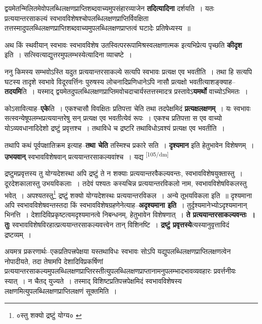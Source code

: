 \documentclass[article,12pt,a4paper]{memoir}
\begin{document}
	  \pstart द्वयमेतन्मिलितमेवोपलब्धिलक्षणप्राप्तिशब्दवाच्यमुपसंहारव्याजेन \textbf{तदित्यादिना} दर्शयति । यतः प्रत्ययान्तरसाकल्यं स्वभावविशेषश्चोपलब्धिलक्षणप्राप्तिर्विवक्षिता तत्तस्मादुपलब्धिलक्षणप्राप्तिशब्दवाच्यमुपलब्धिलक्षणप्राप्तत्वं घटादेः प्रतिषेध्यस्य ॥
	\pend
      

	  \pstart अथ किं स्थवीयान् स्वभावः स्वभावविशेष उतस्वित्पररूपामिश्रस्वलक्षणात्मक इत्यभिप्रेत्य पृच्छति \textbf{कीदृश} इति । सत्स्वित्याद्युत्तरमुपलम्भस्येत्यादिना व्याचष्टे ।
	\pend
      

	  \pstart ननु किमस्य सम्भवोऽस्ति यदुत प्रत्ययान्तरसाकल्ये सत्यपि स्वभावः प्रत्यक्ष एव भवतीति । तथा हि सत्यपि घटस्य तादृशे स्वभावे विदूरवर्त्तिनः पुरुषस्य लोचनादिप्रणिधानेऽपि नासौ प्रत्यक्षो भवतीत्याशङ्क्याह--\textbf{तदयमि}ति । यस्माद् द्वयमेतदुपलब्धिलक्षणप्राप्तिमवोचदाचार्यस्तत्तस्मादत्र प्रस्तावेऽ\textbf{यमर्थो} वाच्योऽभिमतः ।
	\pend
      

	  \pstart कोऽसावित्याह--\textbf{एके}ति । एकश्चासौ विवक्षितः प्रतिपत्ता चेति तथा तदपेक्षमिदं \textbf{प्रत्यक्षलक्षणम्} । यः स्वभावः सत्स्वन्येषूपलम्भप्रत्ययान्तरेषु सन् प्रत्यक्ष एव भवतीत्येवं रूपः । एकश्च प्रतिपत्ता स एव वाच्यो योऽव्यवधानादिदेशो द्रष्टुं प्रवृत्तश्च । तथाविधे च द्रष्टरि तथाविधोऽवश्यं प्रत्यक्ष एव भवतीति ।
	\pend
      

	  \pstart तथापि कथं पूर्वपक्षातिक्रम इत्याह--\textbf{तथा चेति} तस्मिश्च प्रकारे सति । \textbf{दृश्यमान} इति हेतुभावेन विशेषणम् । \textbf{उभयवान्} स्वभावविशेषवान् प्रत्ययान्तरसाकल्यवांश्च । यद्य  \leavevmode\textsuperscript{\rmlatinfont\tiny [105/dm]} 
	  
	द्रष्टुमप्रवृत्तस्य तु योग्यदेशस्था अपि द्रष्टुं ते न शक्याः प्रत्ययान्तरवैकल्यवन्तः, स्वभावविशेषयुक्तास्तु । दूरदेशकालास्तु उभयविकलाः । तदेवं पश्यतः कस्यचिन्न प्रत्ययान्तरविकलो नाम, स्वभावविशेषविकलस्तु भवेत् । अपश्यतस्तु\footnote{०स्तु शक्यो द्रष्टुं योग्य० \cite{dp-msA} \cite{dp-edP} \cite{dp-edH} \cite{dp-edE} \cite{dp-edN}} द्रष्टुं शक्यो योग्यदेशस्थः प्रत्ययान्तरविकल । अन्ये तूभयविकला इति ॥ दृश्यमाना अपि स्वभावविशेषवन्तस्तदा किं स्वभावविशेषग्रहणेनेत्याह--\textbf{अदृश्यमाना इति} । तुर्दृश्यमानेभ्योऽदृश्यमानान् भिनत्ति । देशादिविप्रकृष्टत्वमदृश्यमानत्वे निबन्धनम्, हेतुभावेन विशेषणात् । \textbf{ते प्रत्ययान्तरसाकल्यवन्तः । तुः} स्वभावविशेषविरहात्प्रत्ययान्तरसाकल्यवत्त्वेन तान् विशिनष्टि । \textbf{द्रष्टुं प्रवृत्तस्ये}त्यस्यानुवृत्ताविदं द्रष्टव्यम् ।
	\pend
      

	  \pstart अयमत्र प्रकरणार्थः--एकप्रतिपत्त्रपेक्षया यस्तथाविधः स्वभावः सोऽपि यद्युपलब्धिलक्षणप्राप्तिलक्षणत्वेन नोपादीयते, तदा तेषामपि देशादिविप्रकर्षिणां प्रत्ययान्तरसाकल्यमुपलब्धिलक्षणप्राप्तिरस्तीत्युपलब्धिलक्षणप्राप्तानामनुपलम्भादभावव्यवहारः प्रवर्त्तनीयः स्यात् । न चैतद् युज्यते । तस्माद् विशिष्टप्रतिपत्त्रपेक्षमिदं स्वभावविशेषस्य लक्षणमित्युपलब्धिलक्षणप्राप्तिलक्षणं सूक्तमिति ।
	\pend
      
\end{document}
